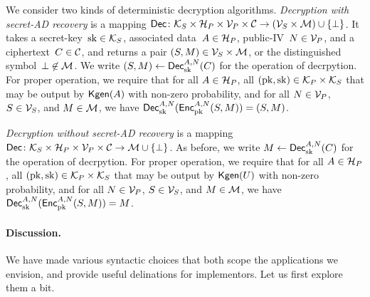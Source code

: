 We consider two kinds of deterministic decryption algorithms.  \emph{Decryption with secret-AD recovery} is 
a mapping ${\mathsf{Dec}} \colon \mathcal{K}_S \times \mathcal{H}_P \times \mathcal{V}_P \times \mathcal{C} \to \left(\mathcal{V}_S \times \mathcal{M}\right) \cup \{\bot\}$.  It takes a secret-key~$\mathrm{sk}\in\mathcal{K}_S$, associated data~$A \in \mathcal{H}_P$, public-IV~$N \in \mathcal{V}_P$, and a ciphertext~$C \in \mathcal{C}$, and returns a pair $(S,M) \in \mathcal{V}_S\times\mathcal{M}$, or the distinguished symbol~$\bot \not\in \mathcal{M}$.  We write $(S,M) \gets {\mathsf{Dec}}_{\mathrm{sk}}^{A,N}(C)$ for the operation of decrpytion. 
For proper operation, we require that for all $A\in\mathcal{H}_P$, all $(\mathrm{pk},\mathrm{sk})\in\mathcal{K}_P\times\mathcal{K}_S$ that may be output by $\mathsf{Kgen}(A)$ with non-zero probability, and for all $N\in\mathcal{V}_P$, $S\in\mathcal{V}_S$, and $M\in\mathcal{M}$, we have ${\mathsf{Dec}}_{\mathrm{sk}}^{A,N}({\mathsf{Enc}}_{\mathrm{pk}}^{A,N}(S,M))=(S,M)$.

\emph{Decryption without secret-AD recovery} is 
a mapping ${\mathsf{Dec}} \colon \mathcal{K}_S \times \mathcal{H}_P \times \mathcal{V}_P \times \mathcal{C} \to \mathcal{M} \cup \{\bot\}$.  As before, we write $M \gets {\mathsf{Dec}}_{\mathrm{sk}}^{A,N}(C)$ for the operation of decrpytion.  For proper operation, we require that for all $A\in\mathcal{H}_P$, all $(\mathrm{pk},\mathrm{sk})\in\mathcal{K}_P\times\mathcal{K}_S$ that may be output by $\mathsf{Kgen}(U)$ with non-zero probability, and for all $N\in\mathcal{V}_P$, $S\in\mathcal{V}_S$, and $M\in\mathcal{M}$, we have ${\mathsf{Dec}}_{\mathrm{sk}}^{A,N}({\mathsf{Enc}}_{\mathrm{pk}}^{A,N}(S,M))=M$.

\paragraph{Discussion. }  We have made various syntactic choices that both scope the applications we envision, and provide useful delinations for implementors.  Let us first explore them a bit.  

